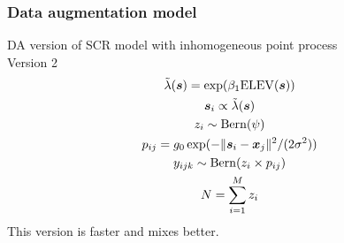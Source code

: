 \documentclass[color=usenames,dvipsnames]{beamer}\usepackage[]{graphicx}\usepackage[]{color}
\begin{document}
\begin{frame}
  \frametitle{Data augmentation model}
  DA version of SCR model with inhomogeneous point process \\
  \centering
  Version 2 \\
  \begin{gather*}
    \tilde{\lambda}({\bm s}) = \exp(\beta_1 \mathrm{ELEV}({\bm s})) \\
    {\bm s}_i \propto \tilde{\lambda}({\bm s}) \\
    z_i \sim \mathrm{Bern}(\psi) \\
    p_{ij} = g_0\exp(-\|{\bm s}_i-{\bm x}_j\|^2/(2\sigma^2)) \\
    y_{ijk} \sim \mathrm{Bern}(z_i\times p_{ij}) \\
    N=\sum_{i=1}^M z_i
  \end{gather*}
  This version is faster and mixes better. \\
\end{frame}
\end{document}
